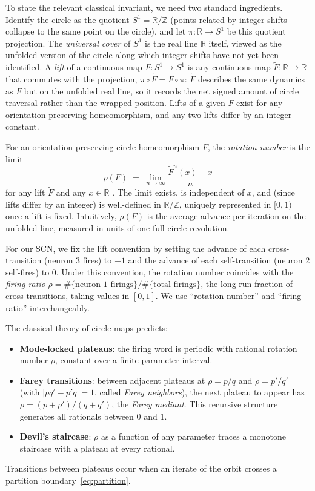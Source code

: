 \documentclass[12pt]{article}
\newcommand{\RR}{\mathbb{R}}
\begin{document}
To state the relevant classical invariant, we need two standard ingredients. Identify the circle as the quotient $S^1=\RR/\mathbb{Z}$ (points related by integer shifts collapse to the same point on the circle), and let $\pi:\RR\to S^1$ be this quotient projection. The \emph{universal cover} of $S^1$ is the real line $\RR$ itself, viewed as the unfolded version of the circle along which integer shifts have not yet been identified. A \emph{lift} of a continuous map $F:S^1\to S^1$ is any continuous map $\widetilde F:\RR\to\RR$ that commutes with the projection, $\pi\circ\widetilde F=F\circ\pi$: $\widetilde F$ describes the same dynamics as $F$ but on the unfolded real line, so it records the net signed amount of circle traversal rather than the wrapped position. Lifts of a given $F$ exist for any orientation-preserving homeomorphism, and any two lifts differ by an integer constant.

For an orientation-preserving circle homeomorphism $F$, the \emph{rotation number} is the limit
\[
\rho(F)\;=\;\lim_{n\to\infty}\frac{\widetilde{F}^n(x)-x}{n}
\]
for any lift $\widetilde{F}$ and any $x\in\RR$ \citep{poincare1885courbes,herman1979conjugaison}. The limit exists, is independent of $x$, and (since lifts differ by an integer) is well-defined in $\RR/\mathbb{Z}$, uniquely represented in $[0,1)$ once a lift is fixed. Intuitively, $\rho(F)$ is the average advance per iteration on the unfolded line, measured in units of one full circle revolution.

For our SCN, we fix the lift convention by setting the advance of each cross-transition (neuron 3 fires) to $+1$ and the advance of each self-transition (neuron 2 self-fires) to $0$. Under this convention, the rotation number coincides with the \emph{firing ratio} $\rho=\#\{\text{neuron-1 firings}\}/\#\{\text{total firings}\}$, the long-run fraction of cross-transitions, taking values in $[0,1]$. We use ``rotation number'' and ``firing ratio'' interchangeably.

The classical theory of circle maps \citep{arnold1961small} predicts:
\begin{itemize}[nosep]
    \item \textbf{Mode-locked plateaus}: the firing word is periodic with rational rotation number $\rho$, constant over a finite parameter interval.
    \item \textbf{Farey transitions}: between adjacent plateaus at $\rho=p/q$ and $\rho=p'/q'$ (with $|pq'-p'q|=1$, called \emph{Farey neighbors}), the next plateau to appear has $\rho=(p+p')/(q+q')$, the \emph{Farey mediant}. This recursive structure generates all rationals between 0 and 1.
    \item \textbf{Devil's staircase}: $\rho$ as a function of any parameter traces a monotone staircase with a plateau at every rational.
\end{itemize}
Transitions between plateaus occur when an iterate of the orbit crosses a partition boundary~\eqref{eq:partition}.
\end{document}
